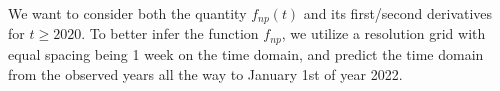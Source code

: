 \documentclass{beamer} %
\begin{document}
\begin{frame}
We want to consider both the quantity $f_{np}(t)$ and its first/second derivatives for $t \geq 2020$. To better infer the function $f_{np}$, we utilize a resolution grid with equal spacing being 1 week on the time domain, and predict the time domain from the observed years all the way to January 1st of year 2022. 
\end{frame}



\begin{frame}
\begin{figure}[p]
    \centering
    \label{fig:realdata_2010}
\end{figure}
\end{frame}
\end{document}
